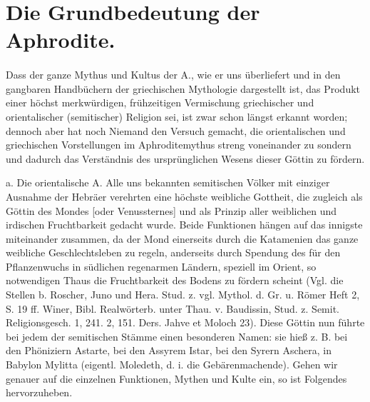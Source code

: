 \documentclass[a4paper, 11pt, oneside]{article}
\begin{document}
\section{Die Grundbedeutung der Aphrodite.}
\paragraph{}
Dass der ganze Mythus und Kultus der A., wie er uns überliefert und in den gangbaren Handbüchern der griechischen Mythologie dargestellt ist, das Produkt einer höchst merkwürdigen, frühzeitigen Vermischung griechischer und orientalischer (semitischer) Religion sei, ist zwar schon längst erkannt worden; dennoch aber hat noch Niemand den Versuch gemacht, die orientalischen und griechischen Vorstellungen im Aphroditemythus streng voneinander zu sondern und dadurch das Verständnis des ursprünglichen Wesens dieser Göttin zu fördern.

a. Die orientalische A. Alle uns bekannten semitischen Völker mit einziger Ausnahme der Hebräer verehrten eine höchste weibliche Gottheit, die zugleich als Göttin des Mondes [oder Venussternes] und als Prinzip aller weiblichen und irdischen Fruchtbarkeit gedacht wurde. Beide Funktionen hängen auf das innigste miteinander zusammen, da der Mond einerseits durch die Katamenien das ganze weibliche Geschlechtsleben zu regeln, anderseits durch Spendung des für den Pflanzenwuchs in südlichen regenarmen Ländern, speziell im Orient, so notwendigen Thaus die Fruchtbarkeit des Bodens zu fördern scheint (Vgl. die Stellen b. Roscher, Juno und Hera. Stud. z. vgl. Mythol. d. Gr. u. Römer Heft 2, S. 19 ff. Winer, Bibl. Realwörterb. unter Thau. v. Baudissin, Stud. z. Semit. Religionsgesch. 1, 241. 2, 151. Ders. Jahve et Moloch 23). Diese Göttin nun führte bei jedem der semitischen Stämme einen besonderen Namen: sie hieß z. B. bei den Phöniziern Astarte, bei den Assyrem Istar, bei den Syrern Aschera, in Babylon Mylitta (eigentl. Moledeth, d. i. die Gebärenmachende). Gehen wir genauer auf die einzelnen Funktionen, Mythen und Kulte ein, so ist Folgendes hervorzuheben.
\end{document}
